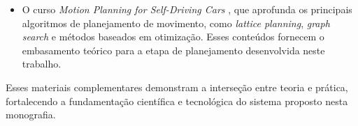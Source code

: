 \documentclass[
	12pt,				%
	oneside, %
	a4paper,			%
	english,			%
	french,				%
	spanish,			%
	brazil				%
	]{abntex2}
\begin{document}
\begin{anexosenv}
\begin{itemize}
  \item O curso \textit{Motion Planning for Self-Driving Cars} \cite{University_of_Toronto2018-mp}, que aprofunda os principais algoritmos de planejamento de movimento, como \textit{lattice planning}, \textit{graph search} e métodos baseados em otimização. Esses conteúdos fornecem o embasamento teórico para a etapa de planejamento desenvolvida neste trabalho.
\end{itemize}

Esses materiais complementares demonstram a interseção entre teoria e prática, fortalecendo a fundamentação científica e tecnológica do sistema proposto nesta monografia.

\end{anexosenv}

\printindex
\end{document}
